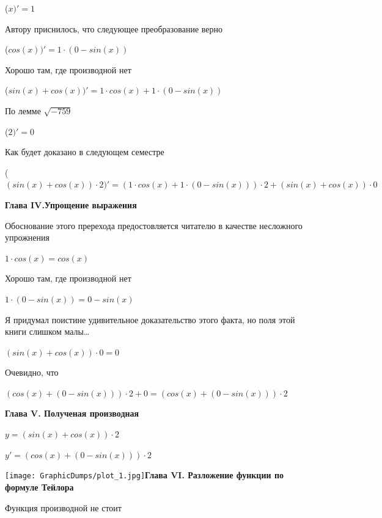 \documentclass[12pt,a4paper,fleqn]{article}
\begin{document}
\begin{center}
 ($x)'
  = 1$\end{center}
Автору приснилось, что следующее преобразование верно

\begin{center}
 ($cos(x))'
  = 1 \cdot (0-sin(x))$\end{center}
Хорошо там, где производной нет\cite{link2}

\begin{center}
 ($sin(x)+cos(x))'
  = 1 \cdot cos(x)+1 \cdot (0-sin(x))$\end{center}
По лемме $\sqrt{-759}$
\begin{center}
 ($2)'
  = 0$\end{center}
Как будет доказано в следующем семестре

\begin{center}
 ($(sin(x)+cos(x)) \cdot 2)'
  = (1 \cdot cos(x)+1 \cdot (0-sin(x))) \cdot 2+(sin(x)+cos(x)) \cdot 0$\end{center}
\newpage \textbf{\LARGE{Глава IV.Упрощение выражения}}

Обоснование этого пререхода предостовляется читателю в качестве несложного упрожнения

\begin{center}
$1 \cdot cos(x) = cos(x)$\end{center}
Хорошо там, где производной нет\cite{link2}

\begin{center}
$1 \cdot (0-sin(x)) = 0-sin(x)$\end{center}
Я придумал поистине удивительное доказательство этого факта, но поля этой книги слишком малы\ldots

\begin{center}
$(sin(x)+cos(x)) \cdot 0 = 0$\end{center}
Очевидно, что

\begin{center}
$(cos(x)+(0-sin(x))) \cdot 2+0 = (cos(x)+(0-sin(x))) \cdot 2$\end{center}
\newpage \textbf{\LARGE{Глава V. Полученая производная}}

$y = $$(sin(x)+cos(x)) \cdot 2$

$y' = $$(cos(x)+(0-sin(x))) \cdot 2$

\texttt{[image: GraphicDumps/plot\_1.jpg]}\newpage \textbf{\LARGE{Глава VI. Разложение функции по формуле Тейлора}}

Функция производной не стоит\cite{link2}
\end{document}
